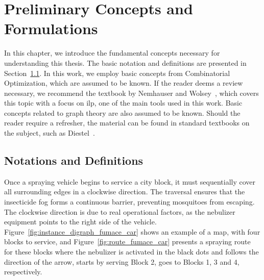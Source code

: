 \chapter{Preliminary Concepts and Formulations}\label{chp:preliminary-concepts}

In this chapter, we introduce the fundamental concepts necessary for
understanding this thesis. The basic notation and definitions are presented in
Section~\ref{sec:not-e-def}. In this work, we employ basic concepts from
Combinatorial Optimization, which are assumed to be known. If the reader deems a
review necessary, we recommend the textbook by Nemhauser and
Wolsey~\cite{Nemhauser}, which covers this topic with a focus on \gls{ilp}, one
of the main tools used in this work. Basic concepts related to graph theory are
also assumed to be known. Should the
reader require a refresher, the material can be found in standard textbooks on
the subject, such as Diestel~\cite{diestel:2005}. 



\section{Notations and Definitions}\label{sec:not-e-def}

Once a spraying vehicle begins to service a city block, it must sequentially
cover all surrounding edges in a clockwise direction. The
traversal ensures that the insecticide fog forms a continuous barrier,
preventing mosquitoes from escaping. 
The clockwise direction is due to real operational factors, 
as the nebulizer equipment points to the right side of the
vehicle. 
Figure~\ref{fig:instance_digraph_fumace_car} shows an example of a map,
with four blocks to service, and Figure~\ref{fig:route_fumace_car} presents a
spraying route for these blocks where the nebulizer is activated in the black
dots and follows the direction of the arrow, starts by serving Block 2, goes to
Blocks 1, 3 and 4, respectively. 

